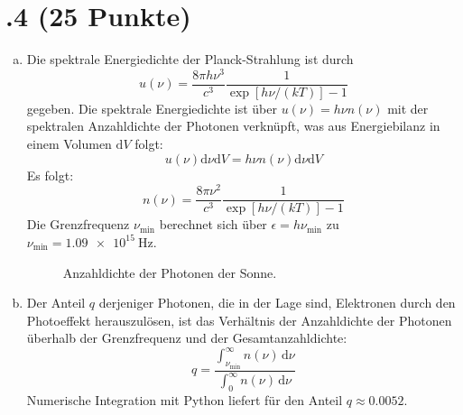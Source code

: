 \section*{\nr.4 \titfour (25 Punkte)}
\begin{enumerate}[(a)]
\item Die spektrale Energiedichte der Planck-Strahlung ist durch
\begin{equation}
u(\nu)  = \frac{8\pi h\nu^3}{c^3}\frac{1}{\exp\left[h\nu/( k T)\right]-1 }
\end{equation}
gegeben.
Die spektrale Energiedichte ist über $u(\nu) = h \nu n(\nu)$ mit der spektralen Anzahldichte der Photonen verknüpft, was aus Energiebilanz in einem Volumen $\mathrm{d}V$ folgt:
\begin{equation}
u(\nu)\mathrm{d}\nu \mathrm{d}V = h \nu n(\nu) \mathrm{d}\nu \mathrm{d}V
\end{equation}
Es folgt:
\begin{equation}
n(\nu)  = \frac{8\pi\nu^2}{c^3}\frac{1}{\exp\left[h\nu/( k T)\right]-1 }
\end{equation}
Die Grenzfrequenz $\nu_\text{min}$ berechnet sich über $\epsilon= h\nu_\text{min}$ zu $\nu_\text{min} = \SI{1.09e15}{\hertz}$.
\begin{figure}[htbp]
\centering

\caption{Anzahldichte der Photonen der Sonne.}
\label{fig:anzahldichte}
\end{figure}
\item Der Anteil $q$ derjeniger Photonen, die in der Lage sind, Elektronen durch den Photoeffekt herauszulösen, ist das Verhältnis der Anzahldichte der Photonen überhalb der Grenzfrequenz und der Gesamtanzahldichte:
\begin{equation}
q = \frac{\int_{\nu_\text{min}}^{\infty} n(\nu) \, \mathrm{d}\nu}{\int_{0}^{\infty} n(\nu) \, \mathrm{d}\nu}
\end{equation}
Numerische Integration mit Python liefert für den Anteil $q\approx \num{0.0052}$.
\end{enumerate}
